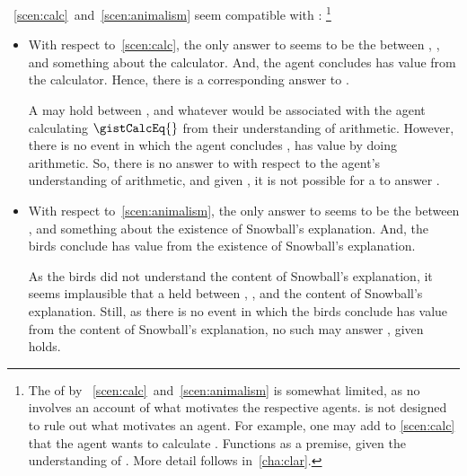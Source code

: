 \begin{note}
  ~\ref{scen:calc}~and~\ref{scen:animalism} seem compatible with \issueInclusion{}:%
  \footnote{
    The  of \qWhy{} by ~\ref{scen:calc}~and~\ref{scen:animalism} is somewhat limited, as no  involves an account of what motivates the respective agents.
    \qWhy{} is not designed to rule out what motivates an agent.
    For example, one may add to \autoref{scen:calc} that the agent wants to calculate \gistCalcLHS{}.
    Functions as a premise, given the understanding of .
    More detail follows in~\autoref{cha:clar}.
  }

  \begin{itemize}[noitemsep]
  \item
    With respect to~\autoref{scen:calc}, the only answer to \qWhy{} seems to be the \ros{} between \propM{\gistCalcEq{}}, , and something about the calculator.
    And, the agent concludes \propM{\gistCalcEq{}} has value  from the calculator.
    Hence, there is a corresponding answer to \qHow{}.

    A \ros{} may hold between \propM{\gistCalcEq{}},  and whatever \pool{} would be associated with the agent calculating \(\gistCalcEq{}\) from their understanding of arithmetic.
    However, there is no event in which the agent concludes \propM{\gistCalcEq{}}, has value  by doing arithmetic.
    So, there is no answer to \qHow{} with respect to the agent's understanding of arithmetic, and given \issueInclusion{}, it is not possible for a \ros{} to answer \qWhy{}.
  \item
    With respect to~\autoref{scen:animalism}, the only answer to \qWhy{} seems to be the \ros{} between ,  and something about the existence of Snowball's explanation.
    And, the birds conclude  has value  from the existence of Snowball's explanation.

    As the birds did not understand the content of Snowball's explanation, it seems implausible that a \ros{} held between , , and the content of Snowball's explanation.
    Still, as there is no event in which the birds conclude  has value  from the content of Snowball's explanation, no such \ros{} may answer \qWhy{}, given \issueInclusion{} holds.
  \end{itemize}
\end{note}

